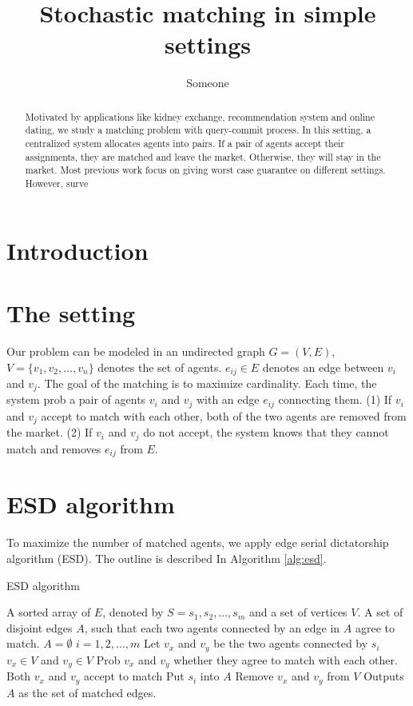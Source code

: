\documentclass[letterpaper]{article}
\title {Stochastic matching in simple settings}
\author {Someone}
\begin{document}
%

\maketitle
\begin{abstract}
Motivated by applications like kidney exchange, recommendation system  and online dating, we study a matching problem with query-commit process.
In this setting, a centralized system allocates agents into pairs. If a pair of agents accept their assignments, they are matched and leave the market.
Otherwise, they will stay in the market.
Most previous work focus on giving worst case guarantee on different settings. 
However, surve
 


\end{abstract}

\section{Introduction}
\section{The setting}

Our problem can be modeled in an undirected graph $G=(V,E)$, $V=\{v_1,v_2,\ldots,v_n\}$ denotes the set of agents. $e_{ij}\in E$ denotes an edge between $v_i$ and $v_j$.
The goal of the matching is to maximize cardinality. Each time, the system prob a pair of agents $v_i$ and $v_j$ with an edge $e_{ij}$ connecting them. 
(1) If $v_i$ and $v_j$ accept to match with each other, both of the two agents are removed from the market.
(2) If $v_i$ and $v_j$ do not accept, the system knows that they cannot match and removes $e_{ij}$ from $E$.

\section{ESD algorithm}

To maximize the number of matched agents, we apply edge serial dictatorship algorithm (ESD).
The outline is described In Algorithm \ref{alg:esd}.

\begin{algorithm}
	\caption{ESD algorithm}
	\label{alg:esd}
	\begin{algorithmic}[1]
		\Require
		A sorted array of $E$, denoted by $S=s_1,s_2,\ldots,s_m$ and a set of vertices $V$.
		\Ensure A set of disjoint edges $A$, such that each two agents connected by an edge in $A$ agree to match. 
		\State $A=\emptyset$
		\For $i=1,2,\ldots,m$
		\State Let $v_x$ and $v_y$ be the two agents connected by $s_i$
		\If $v_x\in V$ and $v_y\in V$
		\State Prob $v_x$ and $v_y$ whether they agree to match with each other.
		\If Both $v_x$ and $v_y$ accept to match
		\State Put $s_i$ into $A$
		\State Remove $v_x$ and $v_y$ from $V$
		\EndIf
		\EndIf
		\EndFor
		\State Outputs $A$ as the set of matched edges.
	\end{algorithmic}
\end{algorithm}
\end{document}
